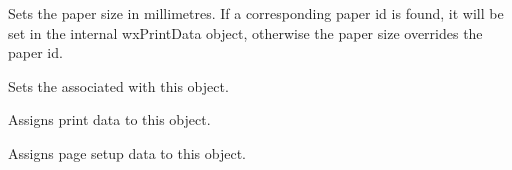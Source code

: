 Sets the paper size in millimetres. If a corresponding paper id is found, it will be set in the
internal wxPrintData object, otherwise the paper size overrides the paper id.

\label{wxpagesetupdialogdatasetprintdata}


Sets the  associated with this object.

\label{wxpagesetupdialogdataassign}


Assigns print data to this object.


Assigns page setup data to this object.

